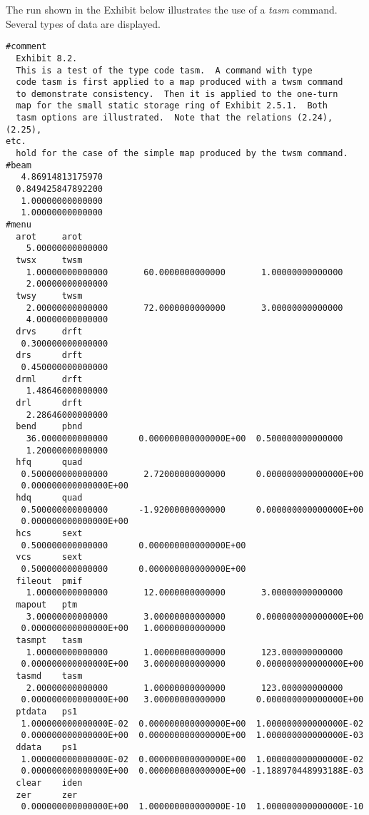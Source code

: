 The \Mary run shown in the Exhibit below illustrates the use of a {\em tasm} command.  Several  types of data are displayed.

\vspace{5mm}
\begin{footnotesize}
\begin{verbatim}
#comment
  Exhibit 8.2.
  This is a test of the type code tasm.  A command with type
  code tasm is first applied to a map produced with a twsm command
  to demonstrate consistency.  Then it is applied to the one-turn
  map for the small static storage ring of Exhibit 2.5.1.  Both
  tasm options are illustrated.  Note that the relations (2.24),(2.25),
etc.
  hold for the case of the simple map produced by the twsm command.
#beam
   4.86914813175970
  0.849425847892200
   1.00000000000000
   1.00000000000000
#menu
  arot     arot
    5.00000000000000
  twsx     twsm
    1.00000000000000       60.0000000000000       1.00000000000000
    2.00000000000000
  twsy     twsm
    2.00000000000000       72.0000000000000       3.00000000000000
    4.00000000000000
  drvs     drft
   0.300000000000000
  drs      drft
   0.450000000000000
  drml     drft
    1.48646000000000
  drl      drft
    2.28646000000000
  bend     pbnd
    36.0000000000000      0.000000000000000E+00  0.500000000000000
    1.20000000000000
  hfq      quad
   0.500000000000000       2.72000000000000      0.000000000000000E+00
   0.000000000000000E+00
  hdq      quad
   0.500000000000000      -1.92000000000000      0.000000000000000E+00
   0.000000000000000E+00
  hcs      sext
   0.500000000000000      0.000000000000000E+00
  vcs      sext
   0.500000000000000      0.000000000000000E+00
  fileout  pmif
    1.00000000000000       12.0000000000000       3.00000000000000
  mapout   ptm
    3.00000000000000       3.00000000000000      0.000000000000000E+00
   0.000000000000000E+00   1.00000000000000
  tasmpt   tasm
    1.00000000000000       1.00000000000000       123.000000000000
   0.000000000000000E+00   3.00000000000000      0.000000000000000E+00
  tasmd    tasm
    2.00000000000000       1.00000000000000       123.000000000000
   0.000000000000000E+00   3.00000000000000      0.000000000000000E+00
  ptdata   ps1
   1.000000000000000E-02  0.000000000000000E+00  1.000000000000000E-02
   0.000000000000000E+00  0.000000000000000E+00  1.000000000000000E-03
  ddata    ps1
   1.000000000000000E-02  0.000000000000000E+00  1.000000000000000E-02
   0.000000000000000E+00  0.000000000000000E+00 -1.188970448993188E-03
  clear    iden
  zer      zer
   0.000000000000000E+00  1.000000000000000E-10  1.000000000000000E-10

\end{verbatim}
\end{footnotesize}
